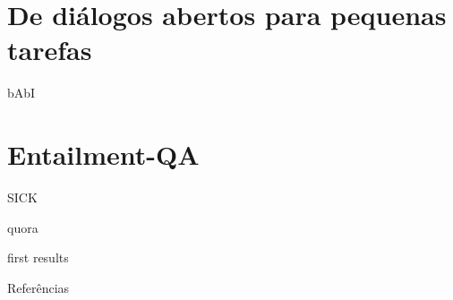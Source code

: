 \documentclass[10pt]{beamer}
\begin{document}
\section{De diálogos abertos para pequenas tarefas}

\begin{frame}{bAbI}

\end{frame}


\section{Entailment-QA}

\begin{frame}{SICK}

\end{frame}

\begin{frame}{quora}

\end{frame}

\begin{frame}{first results}

\end{frame}




\begin{frame}[allowframebreaks]{Referências}

  
  

\end{frame}
\end{document}
